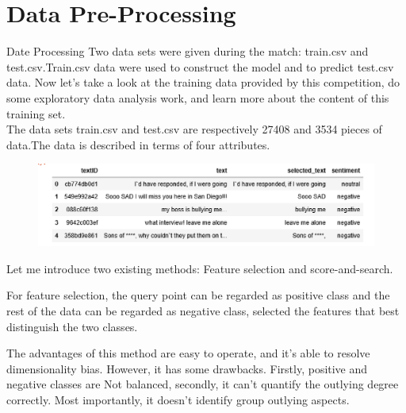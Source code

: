 \documentclass[
 size=14pt,
 paper=smartboard,  %
 mode=present, 		%
 display=slides, 	%
 style=tuliplab,  	%
 pauseslide,
 fleqn,leqno]{powerdot}
\begin{document}


\section{Data Pre-Processing}


\begin{slide}{Date Processing}
Two data sets were given during the match: train.csv 
and test.csv.Train.csv data were used to construct the model and 
to predict test.csv data.
Now let's take a look at the training data provided by this 
competition, do some exploratory data analysis work, and learn more about
 the content of this training set.~\\
 The data sets train.csv and test.csv are respectively 27408 and 3534 pieces 
 of data.The data is described in terms of four attributes.

\bigskip
\begin{figure}[htbp]
  \centering
  \includegraphics[width=1\textwidth]{kaggle/01.1.eps}
  \caption{}
\end{figure}




\begin{note}
Let me introduce two existing methods:
Feature selection and score-and-search.

For feature selection,
the query point can be regarded as positive class and
the rest of the data can be regarded as negative class,
selected the features that best distinguish the two classes.

The advantages of this method are easy to operate,
and it's able to resolve dimensionality bias.
However, it has some drawbacks.
Firstly,
positive and negative classes are Not balanced,
secondly,
it can't quantify the outlying degree correctly.
Most importantly,
it doesn't identify group outlying aspects.
\end{note}

\end{slide}
\end{document}
